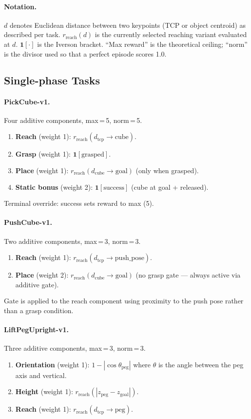 \documentclass{article}
\begin{document}
\paragraph{Notation.}
$d$ denotes Euclidean distance between two keypoints (TCP or object centroid) as
described per task. $r_\text{reach}(d)$ is the currently selected reaching variant
evaluated at $d$. $\mathbf{1}[\cdot]$ is the Iverson bracket. ``Max reward'' is the
theoretical ceiling; ``norm'' is the divisor used so that a perfect episode scores 1.0.

\subsection*{Single-phase Tasks}

\paragraph{PickCube-v1.}
Four additive components, max\,=\,5, norm\,=\,5.
\begin{enumerate}
  \item \textbf{Reach} (weight 1): $r_\text{reach}(d_\text{tcp}{\to}\text{cube})$.
  \item \textbf{Grasp} (weight 1): $\mathbf{1}[\text{grasped}]$.
  \item \textbf{Place} (weight 1): $r_\text{reach}(d_\text{cube}{\to}\text{goal})$ (only when grasped).
  \item \textbf{Static bonus} (weight 2): $\mathbf{1}[\text{success}]$ (cube at goal + released).
\end{enumerate}
Terminal override: success sets reward to max (5).

\paragraph{PushCube-v1.}
Two additive components, max\,=\,3, norm\,=\,3.
\begin{enumerate}
  \item \textbf{Reach} (weight 1): $r_\text{reach}(d_\text{tcp}{\to}\text{push\_pose})$.
  \item \textbf{Place} (weight 2): $r_\text{reach}(d_\text{cube}{\to}\text{goal})$ (no grasp gate --- always active via additive gate).
\end{enumerate}
Gate is applied to the reach component using proximity to the push pose rather than a grasp condition.

\paragraph{LiftPegUpright-v1.}
Three additive components, max\,=\,3, norm\,=\,3.
\begin{enumerate}
  \item \textbf{Orientation} (weight 1): $1 - |\cos\theta_\text{peg}|$ where $\theta$ is the angle between the peg axis and vertical.
  \item \textbf{Height} (weight 1): $r_\text{reach}(|z_\text{peg} - z_\text{goal}|)$.
  \item \textbf{Reach} (weight 1): $r_\text{reach}(d_\text{tcp}{\to}\text{peg})$.
\end{enumerate}
\end{document}
